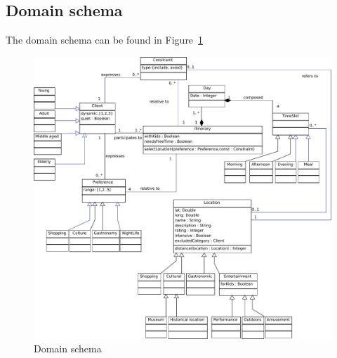 \documentclass[11pt]{article} %
\begin{document}

\subsection{Domain schema}
The domain schema can be found in Figure~\ref{fig:ClassDiagram}

\begin{figure}[h]
\centering
\includegraphics[width=\textwidth]{images/ClassDiagram.pdf}
\caption{Domain schema}
\label{fig:ClassDiagram}
\end{figure}
\end{document}
